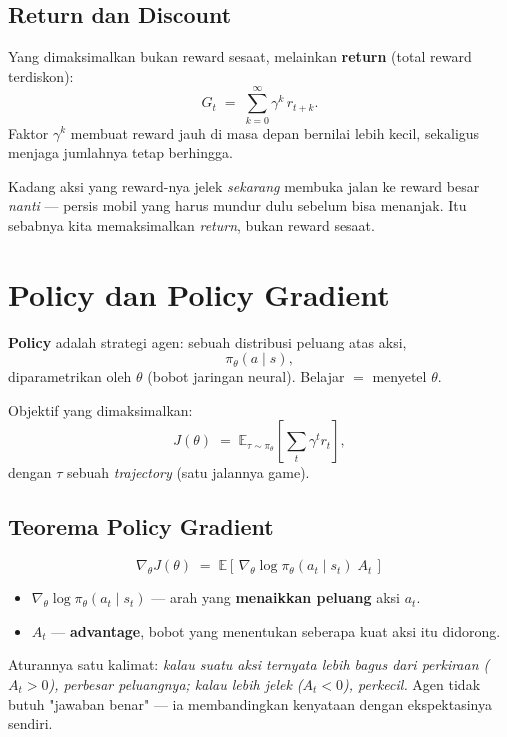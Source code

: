 \documentclass[11pt,a4paper]{article}
\newcommand{\E}{\mathbb{E}}
\begin{document}
\subsection{Return dan Discount}
Yang dimaksimalkan bukan reward sesaat, melainkan \textbf{return} (total reward terdiskon):
\[ G_t \;=\; \sum_{k=0}^{\infty} \gamma^{k}\, r_{t+k}. \]
Faktor $\gamma^k$ membuat reward jauh di masa depan bernilai lebih kecil, sekaligus
menjaga jumlahnya tetap berhingga.

\begin{intuisi}
Kadang aksi yang reward-nya jelek \emph{sekarang} membuka jalan ke reward besar
\emph{nanti} --- persis mobil yang harus mundur dulu sebelum bisa menanjak.
Itu sebabnya kita memaksimalkan \emph{return}, bukan reward sesaat.
\end{intuisi}

\section{Policy dan Policy Gradient}
\textbf{Policy} adalah strategi agen: sebuah distribusi peluang atas aksi,
\[ \pi_\theta(a \mid s), \]
diparametrikan oleh $\theta$ (bobot jaringan neural). Belajar $=$ menyetel $\theta$.

Objektif yang dimaksimalkan:
\[ J(\theta) \;=\; \E_{\tau \sim \pi_\theta}\!\left[\sum_{t} \gamma^t r_t\right], \]
dengan $\tau$ sebuah \emph{trajectory} (satu jalannya game).

\subsection{Teorema Policy Gradient}
\[ \boxed{\;\nabla_\theta J(\theta) \;=\; \E\!\left[\, \nabla_\theta \log \pi_\theta(a_t \mid s_t)\; A_t \,\right]\;} \]
\begin{itemize}[nosep]
  \item $\nabla_\theta \log \pi_\theta(a_t\mid s_t)$ --- arah yang \textbf{menaikkan peluang} aksi $a_t$.
  \item $A_t$ --- \textbf{advantage}, bobot yang menentukan seberapa kuat aksi itu didorong.
\end{itemize}

\begin{intuisi}
Aturannya satu kalimat: \emph{kalau suatu aksi ternyata lebih bagus dari perkiraan
($A_t>0$), perbesar peluangnya; kalau lebih jelek ($A_t<0$), perkecil.}
Agen tidak butuh "jawaban benar" --- ia membandingkan kenyataan dengan ekspektasinya sendiri.
\end{intuisi}
\end{document}

